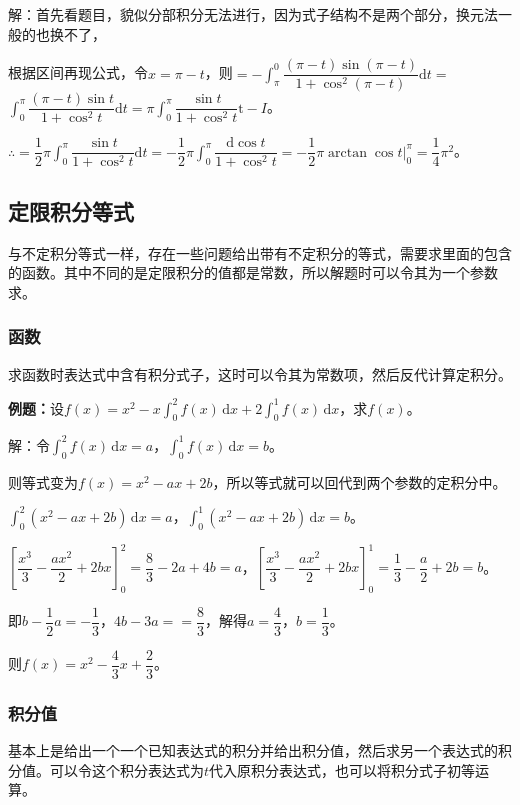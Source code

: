 \documentclass[UTF8, 12pt]{ctexart}
\begin{document}
解：首先看题目，貌似分部积分无法进行，因为式子结构不是两个部分，换元法一般的也换不了，

根据区间再现公式，令$x=\pi-t$，则$=-\displaystyle{\int_\pi^0\dfrac{(\pi-t)\sin(\pi-t)}{1+\cos^2(\pi-t)}\textrm{d}t}=$\\$\displaystyle{\int_0^\pi\dfrac{(\pi-t)\sin t}{1+\cos^2t}\textrm{d}t}=\pi\displaystyle{\int_0^\pi\dfrac{\sin t}{1+\cos^2t}\textrm{t}-I}$。

$\therefore=\dfrac{1}{2}\pi\displaystyle{\int_0^\pi\dfrac{\sin t}{1+\cos^2t}\textrm{d}t}=-\dfrac{1}{2}\pi\int_0^\pi\dfrac{\textrm{d}\cos t}{1+\cos^2t}=-\dfrac{1}{2}\pi\arctan\cos t\bigg|_0^\pi=\dfrac{1}{4}\pi^2$。

\subsection{定限积分等式}

与不定积分等式一样，存在一些问题给出带有不定积分的等式，需要求里面的包含的函数。其中不同的是定限积分的值都是常数，所以解题时可以令其为一个参数求。

\subsubsection{函数}

求函数时表达式中含有积分式子，这时可以令其为常数项，然后反代计算定积分。

\textbf{例题：}设$f(x)=x^2-x\int_0^2f(x)\,\textrm{d}x+2\int_0^1f(x)\,\textrm{d}x$，求$f(x)$。

解：令$\int_0^2f(x)\,\textrm{d}x=a$，$\int_0^1f(x)\,\textrm{d}x=b$。

则等式变为$f(x)=x^2-ax+2b$，所以等式就可以回代到两个参数的定积分中。

$\int_0^2(x^2-ax+2b)\,\textrm{d}x=a$，$\int_0^1(x^2-ax+2b)\,\textrm{d}x=b$。

$\left[\dfrac{x^3}{3}-\dfrac{ax^2}{2}+2bx\right]_0^2=\dfrac{8}{3}-2a+4b=a$，$\left[\dfrac{x^3}{3}-\dfrac{ax^2}{2}+2bx\right]_0^1=\dfrac{1}{3}-\dfrac{a}{2}+2b=b$。

即$b-\dfrac{1}{2}a=-\dfrac{1}{3}$，$4b-3a==\dfrac{8}{3}$，解得$a=\dfrac{4}{3}$，$b=\dfrac{1}{3}$。

则$f(x)=x^2-\dfrac{4}{3}x+\dfrac{2}{3}$。

\subsubsection{积分值}

基本上是给出一个一个已知表达式的积分并给出积分值，然后求另一个表达式的积分值。可以令这个积分表达式为$t$代入原积分表达式，也可以将积分式子初等运算。
\end{document}
